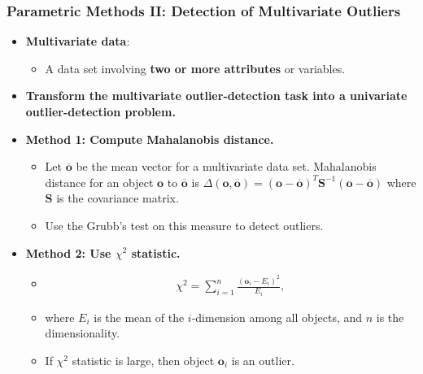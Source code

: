 \begin{frame}
	\frametitle{Parametric Methods II: Detection of Multivariate Outliers}
	\begin{itemize}
		\item \textbf{Multivariate data}:
		      \begin{itemize}
			      \item A data set involving \textbf{\color{airforceblue}two or more attributes} or variables.
		      \end{itemize}
		\item \textbf{Transform the multivariate outlier-detection task into a univariate outlier-detection problem.}
		\item \textbf{Method 1: Compute Mahalanobis distance.}
		      \begin{itemize}
			      \item Let $\mathbf{\overline{o}}$ be the mean vector for a multivariate data set. Mahalanobis distance for an object $\mathbf{o}$ to $\mathbf{\overline{o}}$ is $\Delta(\mathbf{o}, \mathbf{\overline{o}}) = (\mathbf{o} - \mathbf{\overline{o}})^T \mathbf{S}^{-1} (\mathbf{o} - \mathbf{\overline{o}})$ where $\mathbf{S}$ is the covariance matrix.
			      \item Use the Grubb's test on this measure to detect outliers.
		      \end{itemize}
		\item \textbf{Method 2: Use $\chi^2$ statistic.}
		      \begin{itemize}
			      \item \vspace{-0.5cm}
			            \begin{align}
				            \chi^2 = \sum^n_{i=1} \frac{(\mathbf{o}_i-E_i)^2}{E_i},
			            \end{align}
			      \item where $E_i$ is the mean of the $i$-dimension among all objects, and $n$ is the dimensionality.
			      \item If $\chi^2$ statistic is large, then object $\mathbf{o}_i$ is an outlier.
		      \end{itemize}
	\end{itemize}
\end{frame}


